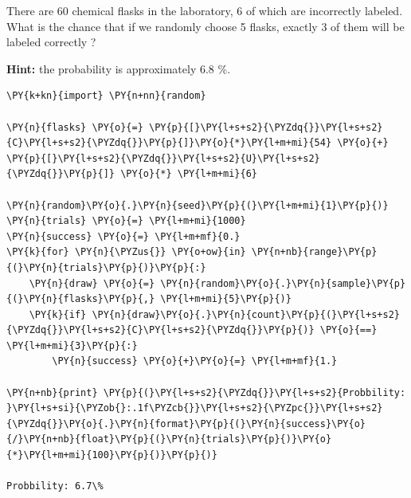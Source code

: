 \begin{Exercise}[title={(Monte Carlo Simulation}]
There are 60 chemical flasks in the laboratory, 6 of which are incorrectly labeled. What is the chance that if we randomly choose 5 flasks, exactly 3 of them will be labeled correctly ?

\textbf{Hint:} the probability is approximately 6.8 \%.
\end{Exercise}

\begin{Answer}
\begin{tcolorbox}[breakable, size=fbox, boxrule=1pt, pad at break*=1mm,colback=cellbackground, colframe=cellborder]
\begin{Verbatim}[commandchars=\\\{\}]
\PY{k+kn}{import} \PY{n+nn}{random}

\PY{n}{flasks} \PY{o}{=} \PY{p}{[}\PY{l+s+s2}{\PYZdq{}}\PY{l+s+s2}{C}\PY{l+s+s2}{\PYZdq{}}\PY{p}{]}\PY{o}{*}\PY{l+m+mi}{54} \PY{o}{+} \PY{p}{[}\PY{l+s+s2}{\PYZdq{}}\PY{l+s+s2}{U}\PY{l+s+s2}{\PYZdq{}}\PY{p}{]} \PY{o}{*} \PY{l+m+mi}{6}

\PY{n}{random}\PY{o}{.}\PY{n}{seed}\PY{p}{(}\PY{l+m+mi}{1}\PY{p}{)}
\PY{n}{trials} \PY{o}{=} \PY{l+m+mi}{1000}
\PY{n}{success} \PY{o}{=} \PY{l+m+mf}{0.}
\PY{k}{for} \PY{n}{\PYZus{}} \PY{o+ow}{in} \PY{n+nb}{range}\PY{p}{(}\PY{n}{trials}\PY{p}{)}\PY{p}{:}
    \PY{n}{draw} \PY{o}{=} \PY{n}{random}\PY{o}{.}\PY{n}{sample}\PY{p}{(}\PY{n}{flasks}\PY{p}{,} \PY{l+m+mi}{5}\PY{p}{)}
    \PY{k}{if} \PY{n}{draw}\PY{o}{.}\PY{n}{count}\PY{p}{(}\PY{l+s+s2}{\PYZdq{}}\PY{l+s+s2}{C}\PY{l+s+s2}{\PYZdq{}}\PY{p}{)} \PY{o}{==} \PY{l+m+mi}{3}\PY{p}{:}
        \PY{n}{success} \PY{o}{+}\PY{o}{=} \PY{l+m+mf}{1.}
        
\PY{n+nb}{print} \PY{p}{(}\PY{l+s+s2}{\PYZdq{}}\PY{l+s+s2}{Probbility: }\PY{l+s+si}{\PYZob{}:.1f\PYZcb{}}\PY{l+s+s2}{\PYZpc{}}\PY{l+s+s2}{\PYZdq{}}\PY{o}{.}\PY{n}{format}\PY{p}{(}\PY{n}{success}\PY{o}{/}\PY{n+nb}{float}\PY{p}{(}\PY{n}{trials}\PY{p}{)}\PY{o}{*}\PY{l+m+mi}{100}\PY{p}{)}\PY{p}{)}

Probbility: 6.7\%
\end{Verbatim}
\end{tcolorbox}
\end{Answer}

